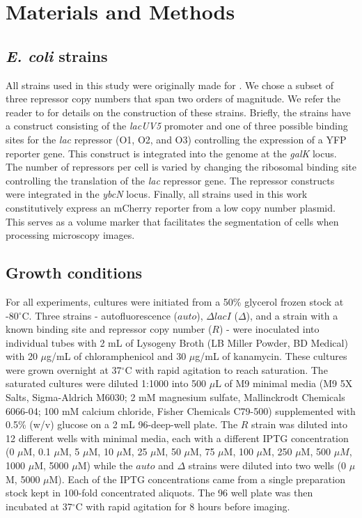 \section{Materials and Methods}

\subsection{\textit{E. coli} strains}

All strains used in this study were originally made for \cite{Razo-Mejia2018}.
We chose a subset of three repressor copy numbers that span two orders of
magnitude. We refer the reader to \cite{Razo-Mejia2018} for details on the
construction of these strains. Briefly, the strains have a construct consisting
of the \textit{lacUV5} promoter and one of three possible binding sites for the
\textit{lac} repressor (O1, O2, and O3) controlling the expression of a YFP
reporter gene. This construct is integrated into the genome at the
\textit{galK} locus. The number of repressors per cell is varied by changing
the ribosomal binding site controlling the translation of the \textit{lac}
repressor gene. The repressor constructs were integrated in the \textit{ybcN}
locus. Finally, all strains used in this work constitutively express an mCherry
reporter from a low copy number plasmid. This serves as a volume marker that
facilitates the segmentation of cells when processing microscopy images.

\subsection{Growth conditions}

For all experiments, cultures were initiated from a 50\% glycerol frozen stock
at -80$^\circ$C. Three strains - autofluorescence ($auto$), $\Delta lacI$
($\Delta$), and a strain with a known binding site and repressor copy number
($R$) - were inoculated into individual tubes with 2 mL of Lysogeny Broth (LB
Miller Powder, BD Medical) with 20 $\mu$g/mL of chloramphenicol and 30
$\mu$g/mL of kanamycin. These cultures were grown overnight at 37$^\circ$C with 
rapid agitation to reach saturation. The saturated cultures were diluted 1:1000
into 500 $\mu$L of M9 minimal media (M9 5X Salts, Sigma-Aldrich M6030; 2 mM
magnesium sulfate, Mallinckrodt Chemicals 6066-04; 100 mM calcium chloride,
Fisher Chemicals C79-500) supplemented with 0.5\% (w/v) glucose on a 2 mL
96-deep-well plate. The $R$ strain was diluted into 12 different wells with
minimal media, each with a different IPTG  concentration (0 $\mu$M, 0.1 $\mu$M,
5 $\mu$M, 10 $\mu$M, 25 $\mu$M, 50 $\mu$M, 75 $\mu$M, 100 $\mu$M, 250 $\mu$M,
500 $\mu M$, 1000 $\mu$M, 5000 $\mu$M) while  the $auto$ and $\Delta$ strains
were diluted into two wells (0 $\mu$M, 5000 $\mu$M). Each of the IPTG
concentrations came from a single preparation stock kept in 100-fold
concentrated aliquots. The 96 well plate was then incubated at 37$^\circ$C with
rapid agitation for 8 hours before imaging.

